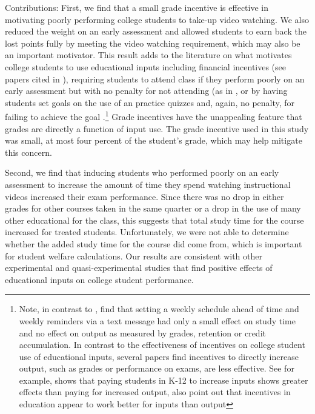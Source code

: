\documentclass[12pt]{article}
\begin{document}
Contributions: First, we find that a small grade incentive is effective in motivating poorly performing college students to take-up video watching. We also reduced the weight on an early assessment and allowed students to earn back the lost points fully by meeting the video watching requirement, which may also be an important motivator. This result adds to the literature on what motivates college students to use educational inputs including financial incentives (see papers cited in \textcite{gmr2011}), requiring students to attend class if they perform poorly on an early assessment but with no penalty for not attending (as in \textcite{dgm2010}, or by having students set goals on the use of an practice quizzes and, again, no penalty, for failing to achieve the goal \parencite{cgpr2020}.\footnote{Note, in contrast to \textcite{cgpr2020}, \textcite{oppp2019} find that setting a weekly schedule ahead of time and weekly reminders via a text message had only a small effect on study time and no effect on output as measured by grades, retention or credit accumulation. In contrast to the effectiveness of incentives on college student use of educational inputs, several papers find incentives to directly increase output, such as grades or performance on exams, are less effective. See for example, \textcite{fryer2011} shows that paying students in K-12 to increase inputs shows greater effects than paying for increased output, \textcite{gmr2011} also point out that incentives in education appear to work better for inputs than output} Grade incentives have the unappealing feature that grades are directly a function of input use. The grade incentive used in this study was small, at most four percent of the student's grade, which may help mitigate this concern.

Second, we find that inducing students who performed poorly on an early assessment to increase the amount of time they spend watching instructional videos increased their exam performance. Since there was no drop in either grades for other courses taken in the same quarter or a drop in the use of many other educational for the class, this suggests that total study time for the course increased for treated students. Unfortunately, we were not able to determine whether the added study time for the course did come from, which is important for student welfare calculations. Our results are consistent with other experimental and quasi-experimental studies that find positive effects of educational inputs on college student performance. %
\end{document}

